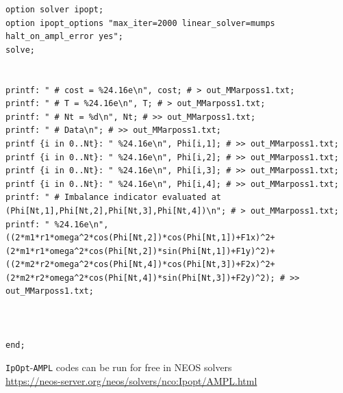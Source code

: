\documentclass{aims}
\theoremstyle{definition}
\begin{document}
\begin{verbatim}
option solver ipopt;
option ipopt_options "max_iter=2000 linear_solver=mumps halt_on_ampl_error yes";
solve;


printf: " # cost = %24.16e\n", cost; # > out_MMarposs1.txt;
printf: " # T = %24.16e\n", T; # > out_MMarposs1.txt;
printf: " # Nt = %d\n", Nt; # >> out_MMarposs1.txt;
printf: " # Data\n"; # >> out_MMarposs1.txt;
printf {i in 0..Nt}: " %24.16e\n", Phi[i,1]; # >> out_MMarposs1.txt;
printf {i in 0..Nt}: " %24.16e\n", Phi[i,2]; # >> out_MMarposs1.txt;
printf {i in 0..Nt}: " %24.16e\n", Phi[i,3]; # >> out_MMarposs1.txt;
printf {i in 0..Nt}: " %24.16e\n", Phi[i,4]; # >> out_MMarposs1.txt;
printf: " # Imbalance indicator evaluated at (Phi[Nt,1],Phi[Nt,2],Phi[Nt,3],Phi[Nt,4])\n"; # > out_MMarposs1.txt;
printf: " %24.16e\n", ((2*m1*r1*omega^2*cos(Phi[Nt,2])*cos(Phi[Nt,1])+F1x)^2+(2*m1*r1*omega^2*cos(Phi[Nt,2])*sin(Phi[Nt,1])+F1y)^2)+((2*m2*r2*omega^2*cos(Phi[Nt,4])*cos(Phi[Nt,3])+F2x)^2+(2*m2*r2*omega^2*cos(Phi[Nt,4])*sin(Phi[Nt,3])+F2y)^2); # >> out_MMarposs1.txt;



end;
\end{verbatim}

\verb!IpOpt!-\verb!AMPL! codes can be run for free in NEOS solvers\\
\url{https://neos-server.org/neos/solvers/nco:Ipopt/AMPL.html}
	
	
	
\end{document}
